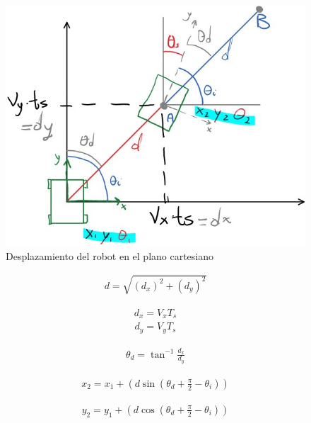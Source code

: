 \documentclass[conference]{IEEEtran}
\begin{document}
\begin{figure}
  \includegraphics[width=\linewidth]{figures/new_positions.jpg}
  \caption{Desplazamiento del robot en el plano cartesiano}
  \label{fig:newpositions}
\end{figure}

\begin{gather}
  d = \sqrt{(d_{x})^2+(d_{y})^2}
\end{gather}

\begin{gather}
  d_{x} = V_{x} T_{s}
\end{gather}
\begin{gather}
  d_{y} = V_{y} T_{s}
\end{gather}

\begin{gather}
  \theta_{d} = \tan^{-1}\frac{d_{x}}{d_{y}}
\end{gather}

\begin{gather}\label{newx}
  x_{2} = x_{1} + 
        \left(
          d
          \sin
            \left(
              {\theta_{d} + \frac{\pi}{2} - \theta_{i} }
            \right)  
        \right) 
\end{gather}

\begin{gather}\label{newy}
  y_{2} = y_{1} + 
        \left(
          d
          \cos
            \left(
              {\theta_{d} + \frac{\pi}{2} - \theta_{i} }
            \right)  
        \right) 
\end{gather}
\end{document}
